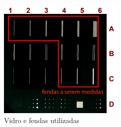 \begin{figure}[H]
	\centering	    
	\includegraphics[scale=0.6]{figuras/rede_dif.png}
	\caption{Vidro e fendas utilizadas}
	\label{fig:rede}
\end{figure}